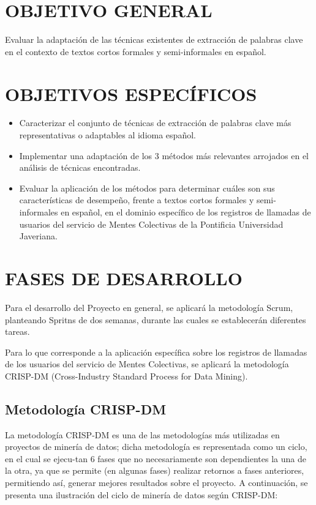 \fontsize{14}{15}\selectfont
\setcounter{secnumdepth}{5}

\section{OBJETIVO GENERAL}
Evaluar la adaptación de las técnicas existentes de extracción de palabras clave en el contexto de textos cortos formales y semi-informales en español.

\section{OBJETIVOS ESPECÍFICOS}
\begin{itemize}
  \item Caracterizar el conjunto de técnicas de extracción de palabras clave más representativas o adaptables al idioma español.
  \item Implementar una adaptación de los 3 métodos más relevantes arrojados en el análisis de técnicas encontradas.
  \item Evaluar la aplicación de los métodos para determinar cuáles son sus características de desempeño, frente a textos cortos formales y semi-informales en español, en el dominio específico de los registros de llamadas de usuarios del servicio de Mentes Colectivas de la Pontificia Universidad Javeriana.
\end{itemize}


\section{FASES DE DESARROLLO}
Para el desarrollo del Proyecto en general, se aplicará la metodología Scrum, planteando Spritns de dos semanas, durante las cuales se establecerán diferentes tareas. \par
Para lo que corresponde a la aplicación específica sobre los registros de llamadas de los usuarios del servicio de Mentes Colectivas, se aplicará la metodología CRISP-DM (Cross-Industry Standard Process for Data Mining). 

\subsection{Metodología CRISP-DM}
La metodología CRISP-DM es una de las metodologías más utilizadas en proyectos de minería de datos; dicha metodología es representada como un ciclo, en el cual se ejecu-tan 6 fases que no necesariamente son dependientes la una de la otra, ya que se permite (en algunas fases) realizar retornos a fases anteriores, permitiendo así, generar mejores resultados sobre el proyecto. A continuación, se presenta una ilustración del ciclo de minería de datos según CRISP-DM:

